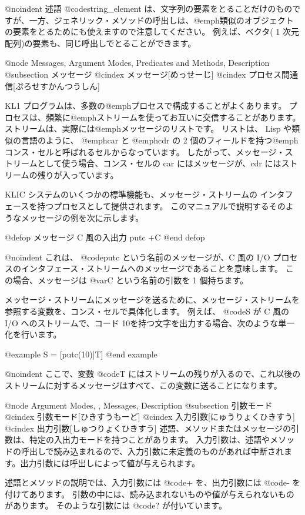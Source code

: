 @noindent
述語 @code{string_element} は、文字列の要素をとることだけのものですが、一方、ジェネリック・メソッドの呼出しは、@emph{類似の}オブジェクトの要素をとるためにも使えますので注意してください。
例えば、ベクタ( 1 次元配列)の要素も、同じ呼出しでとることができます。

@node Messages, Argument Modes, Predicates and Methods, Description
@subsection メッセージ
@cindex メッセージ[めっせーじ]
@cindex プロセス間通信[ぷろせすかんつうしん]

KL1 プログラムは、多数の@emph{プロセス}で構成することがよくあります。
プロセスは、頻繁に@emph{ストリーム}を使ってお互いに交信することがあります。
ストリームは、実際には@emph{メッセージ}のリストです。
リストは、 Lisp や類似の言語のように、 @emph{car} と @emph{cdr} の 2 個のフィールドを持つ@emph{コンス}・セルと呼ばれるセルからなっています。
したがって、メッセージ・ストリームとして使う場合、コンス・セルの car にはメッセージが、cdr にはストリームの残りが入っています。

KLIC システムのいくつかの標準機能も、メッセージ・ストリームの
インタフェースを持つプロセスとして提供されます。
このマニュアルで説明するそのようなメッセージの例を次に示します。

@defop {メッセージ} {C 風の入出力} putc +C
@end defop

@noindent
これは、 @code{putc} という名前のメッセージが、C 風の I/O プロセスのインタフェース・ストリームへのメッセージであることを意味します。
この場合、メッセージは @var{C} という名前の引数を 1 個持ちます。

メッセージ・ストリームにメッセージを送るために、メッセージ・ストリームを参照する変数を、コンス・セルで具体化します。
例えば、 @code{S} が C 風の I/O へのストリームで、コード 10を持つ文字を出力する場合、次のような単一化を行います。

@example
S = [putc(10)|T]
@end example

@noindent
ここで、変数 @code{T} にはストリームの残りが入るので、これ以後のストリームに対するメッセージはすべて、この変数に送ることになります。

@node Argument Modes,  , Messages, Description
@subsection 引数モード
@cindex 引数モード[ひきすうもーど]
@cindex 入力引数[にゅうりょくひきすう]
@cindex 出力引数[しゅつりょくひきすう]
述語、メソッドまたはメッセージの引数は、特定の入出力モードを持つことがあります。
入力引数は、述語やメソッドの呼出しで読み込まれるので、入力引数に未定義のものがあれば中断されます。出力引数には呼出しによって値が与えられます。

述語とメソッドの説明では、入力引数には @code{+} を、出力引数には @code{-} を付けてあります。
引数の中には、読み込まれないものや値が与えられないものがあります。
そのような引数には @code{?} が付いています。

